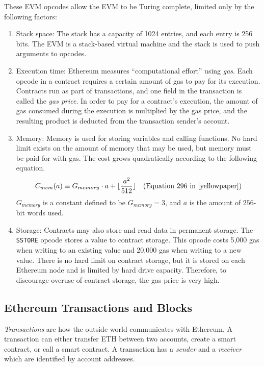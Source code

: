 \documentclass[12pt]{article}
\begin{document}
These EVM opcodes allow the EVM to be Turing complete, limited only by the following factors:
\begin{enumerate}
  \item Stack space: The stack has a capacity of 1024 entries, and each entry is 256 bits. The EVM is a stack-based virtual machine and the stack is used to push arguments to opcodes.
  \item Execution time: Ethereum measures ``computational effort'' using \emph{gas}. Each opcode in a contract requires a certain amount of gas to pay for its execution. Contracts run as part of transactions, and one field in the transaction is called the \emph{gas price}. In order to pay for a contract's execution, the amount of gas consumed during the execution is multiplied by the gas price, and the resulting product is deducted from the transaction sender's account.
  \item Memory: Memory is used for storing variables and calling functions. No hard limit exists on the amount of memory that may be used, but memory must be paid for with gas. The cost grows quadratically according to the following equation.
  \begin{align*}
    C_{mem}(a) &\equiv G_{memory} \cdot a + \lfloor \frac{a^2}{512} \rfloor  & \text{(Equation 296 in~\cite{yellowpaper})}\\
  \end{align*}
  $G_{memory}$ is a constant defined to be $G_{memory} = 3$, and $a$ is the amount of $256$-bit words used.
  \item Storage: Contracts may also store and read data in permanent storage. The \texttt{SSTORE} opcode stores a value to contract storage. This opcode costs 5,000 gas when writing to an existing value and 20,000 gas when writing to a new value. There is no hard limit on contract storage, but it is stored on each Ethereum node and is limited by hard drive capacity. Therefore, to discourage overuse of contract storage, the gas price is very high.
\end{enumerate}



\subsection{Ethereum Transactions and Blocks}

\emph{Transactions} are how the outside world communicates with Ethereum. A transaction can either transfer ETH between two accounts, create a smart contract, or call a smart contract. A transaction has a \emph{sender} and a \emph{receiver} which are identified by account addresses.
\end{document}
